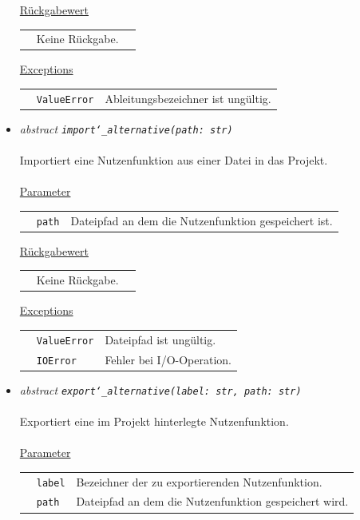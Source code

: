 \documentclass{article}
\begin{document}
\begin{itemize}
\underline{Rückgabewert}\\
\begin{tabular}{lll}
 & Keine Rückgabe.\\
\end{tabular}

\underline{Exceptions}\\
\begin{tabular}{lll}
 & \texttt{ValueError} & Ableitungsbezeichner ist ungültig.\\
\end{tabular}


\item \textit{\flqq{}abstract\frqq} \texttt{\textit{import\char`_alternative(path: str)}}\\\\
Importiert eine Nutzenfunktion aus einer Datei in das Projekt.
\\\\
\underline{Parameter}\\
\begin{tabular}{lll}
 & \texttt{path} & Dateipfad an dem die Nutzenfunktion gespeichert ist.\\
\end{tabular}

\underline{Rückgabewert}\\
\begin{tabular}{lll}
 & Keine Rückgabe.\\
\end{tabular}

\underline{Exceptions}\\
\begin{tabular}{lll}
 & \texttt{ValueError} & Dateipfad ist ungültig.\\
 & \texttt{IOError} & Fehler bei I/O-Operation.\\
\end{tabular}


\item \textit{\flqq{}abstract\frqq} \texttt{\textit{export\char`_alternative(label: str, path: str)}}\\\\
Exportiert eine im Projekt hinterlegte Nutzenfunktion.
\\\\
\underline{Parameter}\\
\begin{tabular}{lll}
 & \texttt{label} & Bezeichner der zu exportierenden Nutzenfunktion.\\
 & \texttt{path} & Dateipfad an dem die Nutzenfunktion gespeichert wird.\\
\end{tabular}


\end{itemize}
\end{document}
